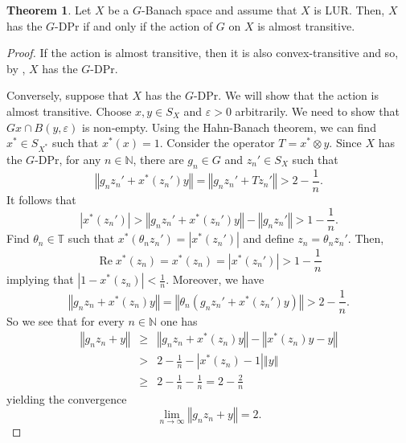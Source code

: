 \documentclass[a4paper,12pt]{amsart}
\theoremstyle{definition}
\newtheorem{theorem}{Theorem}[section]
\theoremstyle{definition}
\theoremstyle{remark}
\numberwithin{equation}{section}
\newcommand{\N}{\mathbb{N}}
\newcommand{\T}{\mathbb{T}}
\DeclareMathOperator{\re}{Re}
\renewcommand{\geq}{\geqslant}
\newcommand{\<}{\langle}
\renewcommand{\>}{\rangle}
\newcommand{\norm}[1]{\left\Vert#1\right\Vert}
\newcommand{\abs}[1]{\left\vert#1\right\vert}
\newcommand{\e}{\varepsilon}
\newcommand{\eps}{\e}
\begin{document}
	\begin{theorem} \label{theorem:GDPrOnUniformlyConvexSpace} Let $X$ be a $G$-Banach space and assume that $X$ is LUR. Then, $X$ has the $G$-DPr if and only if the action of $G$ on $X$ is almost transitive.
	\end{theorem}
	\begin{proof}
		If the action is almost transitive, then it is also convex-transitive and so, by , $X$ has the $G$-DPr.
		
		Conversely, suppose that $X$ has the $G$-DPr. We will show that the action is almost transitive. Choose $x,y \in S_X$ and $\eps > 0$ arbitrarily. We need to show that $Gx \cap B(y, \eps)$ is non-empty. Using the Hahn-Banach theorem, we can find $x^* \in S_{X^*}$ such that $x^*(x) = 1$. Consider the operator $T = x^* \otimes y$.
		Since $X$ has the $G$-DPr, for any $n \in \N$, there are $g_n \in G$ and $z_n' \in S_X$ such that
		\begin{equation*}
			\norm{g_n z_n' + x^*(z_n')y} = \norm{g_n z_n' + T z_n'} > 2 - \frac{1}{n}.
		\end{equation*}
		It follows that 
		\begin{equation*} 
			\abs{x^*(z_n')} > \norm{g_n z_n' + x^*(z_n')y} - \norm{g_n z_n'} > 1 - \frac{1}{n}.
		\end{equation*} 
		Find $\theta_n \in \T$ such that $x^*(\theta_n z_n') = |x^*(z_n')|$ and define $z_n = \theta_n z_n'$. Then, 
		\begin{equation*} 
			\re x^*(z_n) = x^*(z_n) = |x^*(z_n')| > 1 - \frac{1}{n}
		\end{equation*}     
		implying that $\abs{1 - x^*(z_n)} < \frac{1}{n}$. Moreover, we have
		\begin{equation*}
			\norm{g_n z_n + x^*(z_n) y} = \norm{\theta_n(g_n z_n' + x^*(z_n')y)} > 2 - \frac{1}{n}.
		\end{equation*}
		So we see that for every $n \in \N$ one has
		\begin{eqnarray*}
			\norm{g_n z_n + y} &\geq& \norm{g_n z_n + x^*(z_n)y} - \norm{x^*(z_n)y - y} \\
			&>& 2 - \frac{1}{n} - \abs{x^*(z_n) - 1}\norm{y} \\
			&\geq& 2 - \frac{1}{n} - \frac{1}{n}
			= 2 - \frac{2}{n}
		\end{eqnarray*}
		yielding the convergence
		\begin{equation} \label{eq:GDPOnLUR:gzPLUSy}
			\lim_{n \to \infty}\norm{g_n z_n + y} = 2.
		\end{equation}

\end{proof}
\end{document}
